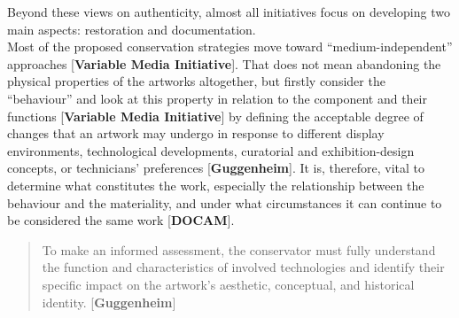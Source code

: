 Beyond these views on authenticity, almost all initiatives focus on developing two main aspects: restoration and documentation.\\
Most of the proposed conservation strategies move toward ``medium-independent'' approaches [\textbf{Variable Media Initiative}]. That does not mean abandoning the physical properties of the artworks altogether, but firstly consider the ``behaviour'' and look at this property in relation to the component and their functions [\textbf{Variable Media Initiative}] by defining the acceptable degree of changes that an artwork may undergo in response to different display environments, technological developments, curatorial and exhibition-design concepts, or technicians’ preferences [\textbf{Guggenheim}]. It is, therefore, vital to determine what constitutes the work, especially the relationship between the behaviour and the materiality, and under what circumstances it can continue to be considered the same work [\textbf{DOCAM}]. 

\begin{quote}
To make an informed assessment, the conservator must fully understand the function and characteristics of involved technologies and identify their specific impact on the artwork’s aesthetic, conceptual, and historical identity. 
[\textbf{Guggenheim}]    
\end{quote}

